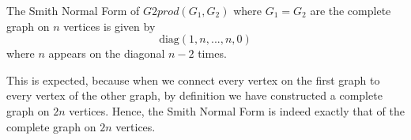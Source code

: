 \begin{theorem}
    The Smith Normal Form of $G2prod(G_1,G_2)$ where $G_1 = G_2$ are the complete graph on $n$ vertices is given by $$\text{diag}(1,n,...,n,0)$$ where $n$ appears on the diagonal $n-2$ times.
\end{theorem}

This is expected, because when we connect every vertex on the first graph to every vertex of the other graph, by definition we have constructed a complete graph on $2n$ vertices. Hence, the Smith Normal Form is indeed exactly that of the complete graph on $2n$ vertices.